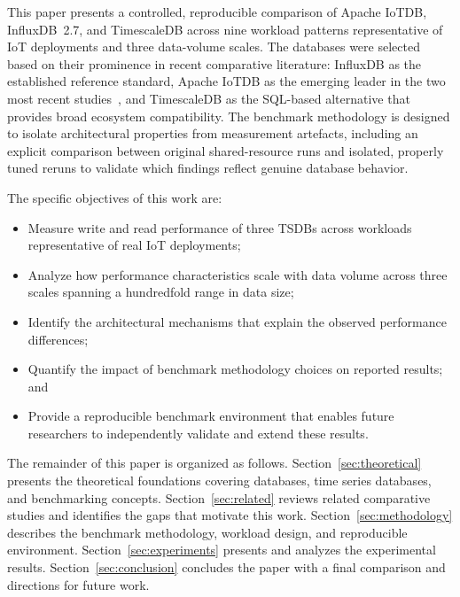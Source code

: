 This paper presents a controlled, reproducible comparison of Apache IoTDB, InfluxDB~2.7,
and TimescaleDB across nine workload patterns representative of IoT deployments and three
data-volume scales. The databases were selected based on their prominence in recent comparative
literature: InfluxDB as the established reference standard, Apache IoTDB as the emerging leader
in the two most recent studies~\citep{pereira2023mulletbench,wang2023iotdb}, and TimescaleDB as
the SQL-based alternative that provides broad ecosystem compatibility. The benchmark methodology
is designed to isolate architectural properties from measurement artefacts, including an
explicit comparison between original shared-resource runs and isolated, properly tuned reruns
to validate which findings reflect genuine database behavior.

The specific objectives of this work are:
\begin{itemize}
  \item Measure write and read performance of three TSDBs across workloads representative of
    real IoT deployments;
  \item Analyze how performance characteristics scale with data volume across three scales
    spanning a hundredfold range in data size;
  \item Identify the architectural mechanisms that explain the observed performance differences;
  \item Quantify the impact of benchmark methodology choices on reported results; and
  \item Provide a reproducible benchmark environment that enables future researchers to
    independently validate and extend these results.
\end{itemize}

The remainder of this paper is organized as follows.
Section~\ref{sec:theoretical} presents the theoretical foundations covering databases,
time series databases, and benchmarking concepts.
Section~\ref{sec:related} reviews related comparative studies and identifies the gaps that
motivate this work.
Section~\ref{sec:methodology} describes the benchmark methodology, workload design, and
reproducible environment.
Section~\ref{sec:experiments} presents and analyzes the experimental results.
Section~\ref{sec:conclusion} concludes the paper with a final comparison and directions
for future work.
